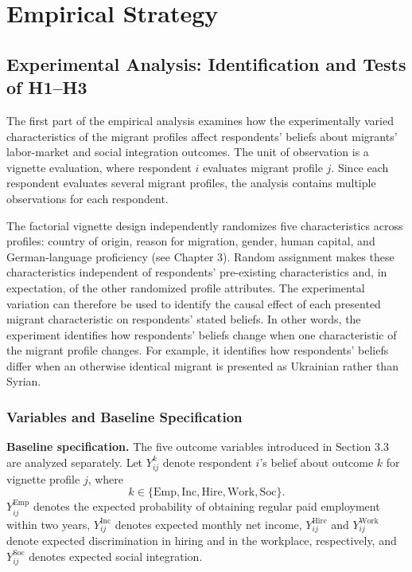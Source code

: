 \section{Empirical Strategy}

\subsection{Experimental Analysis: Identification and Tests of H1–H3}

The first part of the empirical analysis examines how the experimentally varied characteristics of the migrant profiles 
affect respondents' beliefs about migrants' labor-market and social integration outcomes. The unit of observation is a 
vignette evaluation, where respondent \(i\) evaluates migrant profile \(j\). Since each respondent evaluates several 
migrant profiles, the analysis contains multiple observations for each respondent.

The factorial vignette design independently randomizes five characteristics across profiles: country of origin, reason 
for migration, gender, human capital, and German-language proficiency (see Chapter 3). Random assignment makes these 
characteristics independent of respondents’ pre-existing characteristics and, in expectation, of the other randomized 
profile attributes. The experimental variation can therefore be used to identify the causal effect of each presented 
migrant characteristic on respondents’ stated beliefs. In other words, the experiment identifies how respondents’ 
beliefs change when one characteristic of the migrant profile changes. For example, it identifies how respondents’ 
beliefs differ when an otherwise identical migrant is presented as Ukrainian rather than Syrian.

\subsubsection{Variables and Baseline Specification}

\noindent\textbf{Baseline specification.} The five outcome variables introduced in Section 3.3 are analyzed separately. 
Let \(Y_{ij}^{k}\) denote respondent \(i\)'s belief about outcome \(k\) for vignette profile \(j\), where
$$ k\in\{\mathrm{Emp},\mathrm{Inc},\mathrm{Hire},\mathrm{Work},\mathrm{Soc}\}. $$
\(Y_{ij}^{\mathrm{Emp}}\) denotes the expected probability of obtaining regular paid employment within two years, 
\(Y_{ij}^{\mathrm{Inc}}\) denotes expected monthly net income, \(Y_{ij}^{\mathrm{Hire}}\) and \(Y_{ij}^{\mathrm{Work}}\) 
denote expected discrimination in hiring and in the workplace, respectively, and \(Y_{ij}^{\mathrm{Soc}}\) denotes 
expected social integration.

